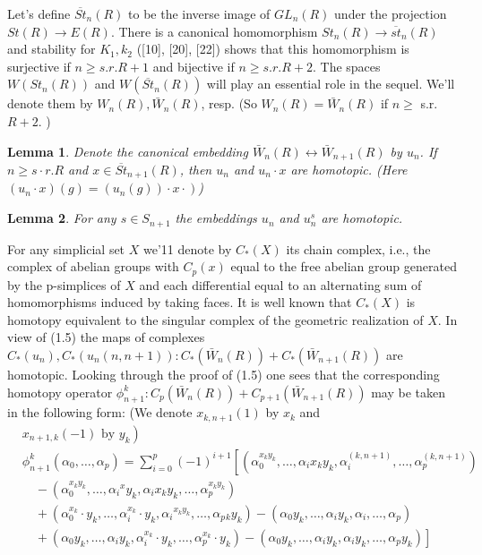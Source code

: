 \documentclass{book}
\newtheorem{lemm}{Lemma}
\begin{document}
Let's define $\overline{S t}_n(R)$ to be the inverse image of $G L_n(R)$ under the projection $S t(R) \rightarrow E(R)$. There is a canonical homomorphism $S t_n(R) \rightarrow \overline{s t}_n(R)$ and stability for $K_1, k_2$ ([10], [20], [22]) shows that this homomorphism is surjective if $n \geq s . r . R+1$ and bijective if $n \geq s . r . R+2$. The spaces $W\left(S t_n(R)\right)$ and $W\left(\overline{S t}_n(R)\right)$ will play an essential role in the sequel. We'll denote them by $W_n(R), \bar{W}_n(R)$, resp. (So $W_n(R)=\bar{W}_n(R)$ if $n \geq$ s.r. $R+2$. )

\begin{lemm}
Denote the canonical embedding $\bar{W}_n(R) \longleftrightarrow \bar{W}_{n+1}(R)$ by $u_n$. If $n \geq s \cdot r . R$ and $x \in \overline{S t}_{n+1}(R)$, then $u_n$ and $u_n \cdot x$ are homotopic. (Here $\left.\left(u_n \cdot x\right)(g)=\left(u_n(g)\right) \cdot x \cdot\right)$)
\end{lemm}

\begin{lemm}
For any $s \in S_{n+1}$ the embeddings $u_n$ and $u_n^s$ are homotopic.   
\end{lemm}


For any simplicial set $X$ we'11 denote by $C_*(X)$ its chain complex, i.e., the complex of abelian groups with $C_p(x)$ equal to the free abelian group generated by the p-simplices of $X$ and each differential equal to an alternating sum of homomorphisms induced by taking faces. It is well known that $C_*(X)$ is homotopy equivalent to the singular complex of the geometric realization of $X$. In view of (1.5) the maps of complexes $C_*\left(u_n\right), C_*\left(u_n(n, n+1)\right): C_*\left(\bar{W}_n(R)\right)+C_*\left(\bar{W}_{n+1}(R)\right)$ are homotopic. Looking through the proof of (1.5) one sees that the corresponding homotopy operator $\phi_{n+1}^k: C_p\left(\bar{W}_n(R)\right)+C_{p+1}\left(\bar{W}_{n+1}(R)\right)$ may be taken in the following form: (We denote $x_{k, n+1}(1)$ by $x_k$ and
$$
\begin{aligned}
& \left.x_{n+1, k}(-1) \text { by } y_k\right) \\
& \phi_{n+1}^k\left(\alpha_0, \ldots, \alpha_p\right)=\sum_{i=0}^p(-1)^{i+1}\left[\left(\alpha_0^{x_k y_k}, \ldots, \alpha_i x_k y_k, \alpha_i^{(k, n+1)}, \ldots, \alpha_p^{(k, n+1)}\right)\right. \\
& \quad-\left(\alpha_0^{x_k y_k}, \ldots, \alpha_i{ }^x y_k, \alpha_i x_k y_k, \ldots, \alpha_p^{x_k y_k}\right) \\
& \quad+\left(\alpha_0^{x_k} \cdot y_k, \ldots, \alpha_i^{x_k} \cdot y_k, \alpha_i{ }^{x_k y_k}, \ldots, \alpha_p{ }_k y_k\right)-\left(\alpha_0 y_k, \ldots, \alpha_i y_k, \alpha_i, \ldots, \alpha_p\right) \\
& \left.\quad+\left(\alpha_0 y_k, \ldots, \alpha_i y_k, \alpha_i^{x_k} \cdot y_k, \ldots, \alpha_p^{x_k} \cdot y_k\right)-\left(\alpha_0 y_k, \ldots, \alpha_i y_k, \alpha_i y_k, \ldots, \alpha_p y_k\right)\right]
\end{aligned}
$$
\end{document}
